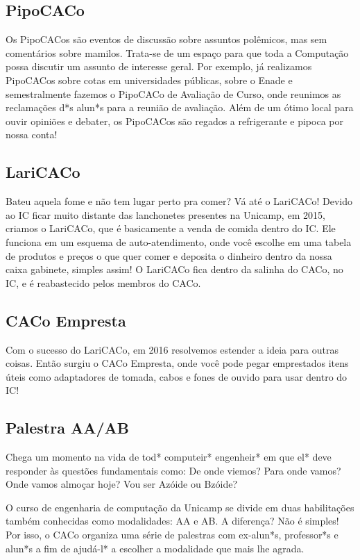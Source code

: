 \subsection{PipoCACo}

Os PipoCACos são eventos de discussão sobre assuntos polêmicos, mas sem
comentários sobre mamilos. Trata-se de um espaço para que toda a Computação
possa discutir um assunto de interesse geral. Por exemplo, já realizamos
PipoCACos sobre cotas em universidades públicas, sobre o Enade e semestralmente
fazemos o PipoCACo de Avaliação de Curso, onde reunimos as reclamações d*s
alun*s para a reunião de avaliação. Além de um ótimo local para ouvir opiniões
e debater, os PipoCACos são regados a refrigerante e pipoca por nossa conta!

\subsection{LariCACo}

Bateu aquela fome e não tem lugar perto pra comer? Vá até o LariCACo! Devido ao
IC ficar muito distante das lanchonetes presentes na Unicamp, em 2015, criamos
o LariCACo, que é basicamente a venda de comida dentro do IC. Ele funciona em
um esquema de auto-atendimento, onde você escolhe em uma tabela de produtos e
preços o que quer comer e deposita o dinheiro dentro da nossa caixa gabinete,
simples assim! O LariCACo fica dentro da salinha do CACo, no IC, e é
reabastecido pelos membros do CACo.

\subsection{CACo Empresta}

Com o sucesso do LariCACo, em 2016 resolvemos estender a ideia para outras
coisas. Então surgiu o CACo Empresta, onde você pode pegar emprestados itens
úteis como adaptadores de tomada, cabos e fones de ouvido para usar dentro do
IC!

\subsection{Palestra AA/AB}

Chega um momento na vida de tod* computeir* engenheir* em que el* deve
responder às questões fundamentais como: De onde viemos? Para onde vamos? Onde
vamos almoçar hoje? Vou ser Azóide ou Bzóide?

O curso de engenharia de computação da Unicamp se divide em duas habilitações
também conhecidas como modalidades: AA e AB. A diferença? Não é simples! Por
isso, o CACo organiza uma série de palestras com ex-alun*s, professor*s e
alun*s a fim de ajudá-l* a escolher a modalidade que mais lhe agrada.

